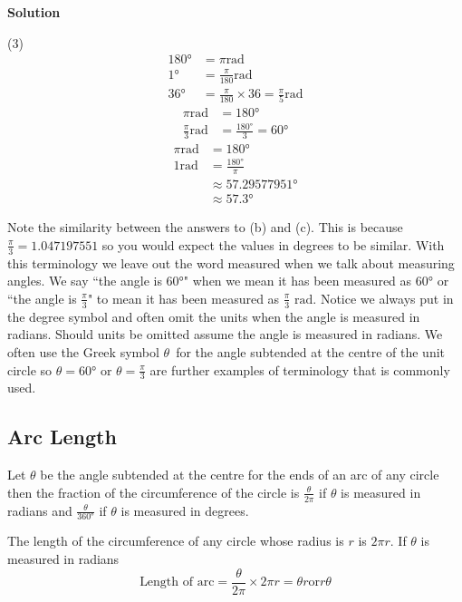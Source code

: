 \textbf{Solution}\begin{tasks}[before-skip = {0ex} , after-skip={-5ex}](3)
\task \begin{align*}\ang{180}  &  =  \pi \text{}\mbox{rad} \\
\ang{1}  &  =  \frac{\pi }{180}\text{}\mbox{rad} \\
\ang{36}  &  =  \frac{\pi }{180} \times 36 =\frac{\pi }{5}\text{}\mbox{rad}\end{align*}
\task
\begin{align*}\pi  \mbox{rad} &  =  \ang{180}  \\
\frac{\pi }{3} \mbox{rad} &  = \frac{\ang{180} }{3} =\ang{60} \end{align*}
\task
\begin{align*}\pi  \mbox{rad} &  =  \ang{180} \\
1 \mbox{rad} &  =  \frac{\ang{180} }{\pi } \\
 &  \approx   \ang{57.29577951}  \\
 &  \approx   \ang{57.3} \end{align*}
\end{tasks}
Note the similarity between the answers to (b) and (c). This is because $\frac{\pi }{3} =1.047197551$ so you would expect the values in degrees to be similar.  With this terminology we leave out the word measured when we talk about measuring angles. We say ``the angle is $\ang{60} $" when we mean it has been measured as $\ang{60} $ or ``the angle is $\frac{\pi }{3}$" to mean it has been measured as $\frac{\pi }{3}$ $\mbox{rad}$. Notice we always put in the degree symbol and often omit the units when the angle is measured in radians. Should units be omitted assume the angle is measured in radians. We often use the Greek symbol $\theta $\ for the angle subtended at the centre of the unit circle so $\theta  =\ang{60} $ or $\theta  =\frac{\pi }{3}$ are further examples of terminology that is commonly used.

\subsection*{Arc Length}
Let $\theta $ be the angle subtended at the centre for the ends of an arc of any circle then the fraction of the circumference of the circle is $\frac{\theta }{2 \pi }$ if $\theta $ is measured in radians and $\frac{\theta }{\ang{360}}$ if $\theta $ is measured in degrees. 

The length of the circumference of any circle whose radius is $r$ is $2 \pi  r$. If $\theta $ is measured in radians
\begin{equation*}\text{Length of arc} =\frac{\theta }{2 \pi } \times 2 \pi  r =\theta  r\text{or}r \theta 
\end{equation*}

